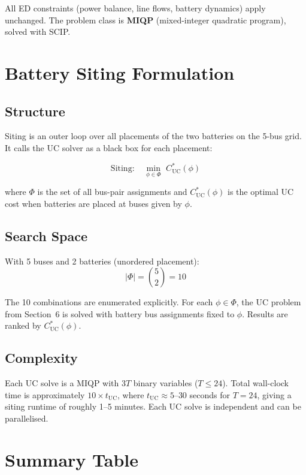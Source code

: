 \documentclass[11pt, letterpaper]{article}
\begin{document}
All ED constraints (power balance, line flows, battery dynamics) apply unchanged.
The problem class is \textbf{MIQP} (mixed-integer quadratic program), solved with SCIP.

\section{Battery Siting Formulation}

\subsection{Structure}

Siting is an outer loop over all placements of the two batteries on the 5-bus grid.
It calls the UC solver as a black box for each placement:

\[
  \text{Siting:} \quad
  \min_{\,\phi \in \Phi\,}\ C^*_{\text{UC}}(\phi)
\]

where $\Phi$ is the set of all bus-pair assignments and $C^*_{\text{UC}}(\phi)$ is
the optimal UC cost when batteries are placed at buses given by $\phi$.

\subsection{Search Space}

With 5 buses and 2 batteries (unordered placement):
\[
  |\Phi| = \binom{5}{2} = 10
\]

The 10 combinations are enumerated explicitly. For each $\phi \in \Phi$, the
UC problem from Section~6 is solved with battery bus assignments fixed to $\phi$.
Results are ranked by $C^*_{\text{UC}}(\phi)$.

\subsection{Complexity}

Each UC solve is a MIQP with $3T$ binary variables ($T \leq 24$).
Total wall-clock time is approximately $10 \times t_{\text{UC}}$, where
$t_{\text{UC}} \approx 5$--$30$ seconds for $T = 24$, giving a siting runtime
of roughly 1--5 minutes. Each UC solve is independent and can be parallelised.

\section{Summary Table}
\end{document}
